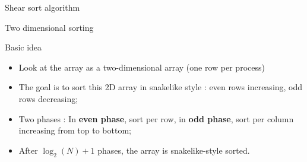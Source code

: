 \documentclass[compress,10pt,aspectratio=169]{beamer}
\begin{document}
\begin{frame}[fragile]{Shear sort algorithm}
  \scriptsize
  \begin{center}{\small Two dimensional sorting}\end{center}

  \begin{block}{\small Basic idea}
    \begin{itemize}
    \item Look at the array as a two-dimensional array (one row per process)
    \item The goal is to sort this 2D array in snakelike style : even rows increasing, odd rows decreasing;
    \item Two phases : In \textbf{even phase}, sort per row,
      in \textbf{odd phase}, sort per column increasing from top to bottom;
    \item After $\log_{2}(N)+1$ phases, the array is snakelike-style sorted.
    \end{itemize}
  \end{block}


\end{frame}
\end{document}
